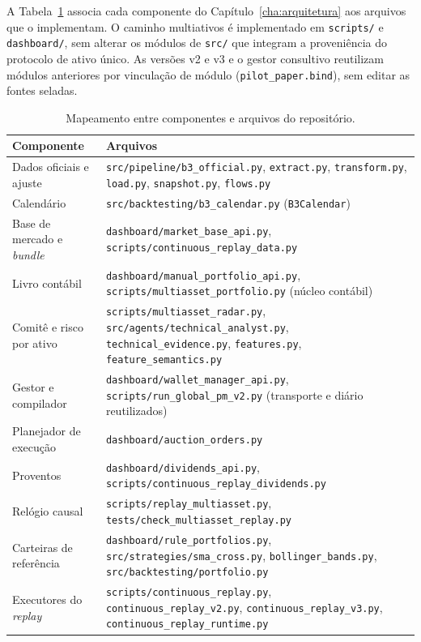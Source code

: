 A Tabela~\ref{tab:mapa-arquivos} associa cada componente do Capítulo~\ref{cha:arquitetura} aos arquivos que o implementam. O caminho multiativos é implementado em \texttt{scripts/} e \texttt{dashboard/}, sem alterar os módulos de \texttt{src/} que integram a proveniência do protocolo de ativo único. As versões v2 e v3 e o gestor consultivo reutilizam módulos anteriores por vinculação de módulo (\texttt{pilot\_paper.bind}), sem editar as fontes seladas.

\begin{table}[htbp]
\centering
\caption{Mapeamento entre componentes e arquivos do repositório.}
\label{tab:mapa-arquivos}
\small
\begin{tabular}{>{\raggedright\arraybackslash}p{4.0cm} >{\raggedright\arraybackslash}p{11.0cm}}
\toprule
\textbf{Componente} & \textbf{Arquivos} \\
\midrule
Dados oficiais e ajuste & \texttt{src/pipeline/b3\_official.py}, \texttt{extract.py}, \texttt{transform.py}, \texttt{load.py}, \texttt{snapshot.py}, \texttt{flows.py} \\
Calendário & \texttt{src/backtesting/b3\_calendar.py} (\texttt{B3Calendar}) \\
Base de mercado e \textit{bundle} & \texttt{dashboard/market\_base\_api.py}, \texttt{scripts/continuous\_replay\_data.py} \\
Livro contábil & \texttt{dashboard/manual\_portfolio\_api.py}, \texttt{scripts/multiasset\_portfolio.py} (núcleo contábil) \\
Comitê e risco por ativo & \texttt{scripts/multiasset\_radar.py}, \texttt{src/agents/technical\_analyst.py}, \texttt{technical\_evidence.py}, \texttt{features.py}, \texttt{feature\_semantics.py} \\
Gestor e compilador & \texttt{dashboard/wallet\_manager\_api.py}, \texttt{scripts/run\_global\_pm\_v2.py} (transporte e diário reutilizados) \\
Planejador de execução & \texttt{dashboard/auction\_orders.py} \\
Proventos & \texttt{dashboard/dividends\_api.py}, \texttt{scripts/continuous\_replay\_dividends.py} \\
Relógio causal & \texttt{scripts/replay\_multiasset.py}, \texttt{tests/check\_multiasset\_replay.py} \\
Carteiras de referência & \texttt{dashboard/rule\_portfolios.py}, \texttt{src/strategies/sma\_cross.py}, \texttt{bollinger\_bands.py}, \texttt{src/backtesting/portfolio.py} \\
Executores do \textit{replay} & \texttt{scripts/continuous\_replay.py}, \texttt{continuous\_replay\_v2.py}, \texttt{continuous\_replay\_v3.py}, \texttt{continuous\_replay\_runtime.py} \\

\end{tabular}
\end{table}
